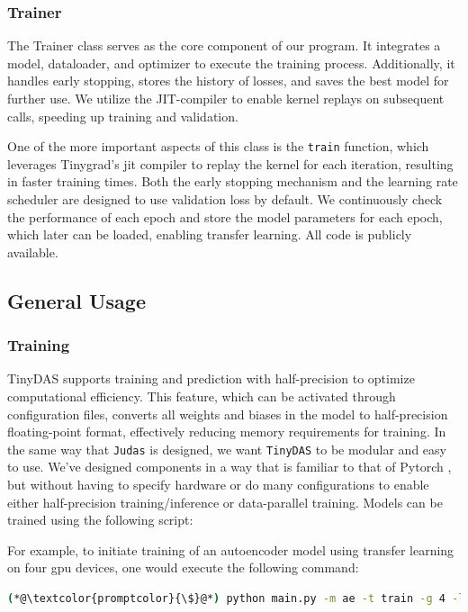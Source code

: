 \subsubsection{Trainer}

The Trainer class serves as the core component of our program. It integrates a model, dataloader, and optimizer to execute the training process. Additionally, it handles early stopping, stores the history of losses, and saves the best model for further use. We utilize the JIT-compiler to enable kernel replays on subsequent calls, speeding up training and validation. 

One of the more important aspects of this class is the \texttt{train} function, which leverages Tinygrad's \acrshort{jit} compiler to replay the kernel for each iteration, resulting in faster training times. Both the early stopping mechanism and the learning rate scheduler are designed to use validation loss by default. We continuously check the performance of each epoch and store the model parameters for each epoch, which later can be loaded, enabling transfer learning. All code is publicly available.


\subsection{General Usage}

\subsubsection{Training}

TinyDAS supports training and prediction with half-precision to optimize computational efficiency. This feature, which can be activated through configuration files, converts all weights and biases in the model to half-precision floating-point format, effectively reducing memory requirements for training. In the same way that \texttt{Judas} is designed, we want \texttt{TinyDAS} to be modular and easy to use. We've designed components in a way that is familiar to that of Pytorch \cite{paszke2019pytorch}, but without having to specify hardware or do many configurations to enable either half-precision training/inference or data-parallel training. Models can be trained using the following script:



For example, to initiate training of an autoencoder model using transfer learning on four \acrshort{gpu} devices, one would execute the following command:
\begin{lstlisting}[style=shellcommand, language=bash]
(*@\textcolor{promptcolor}{\$}@*) python main.py -m ae -t train -g 4 -l
\end{lstlisting}

